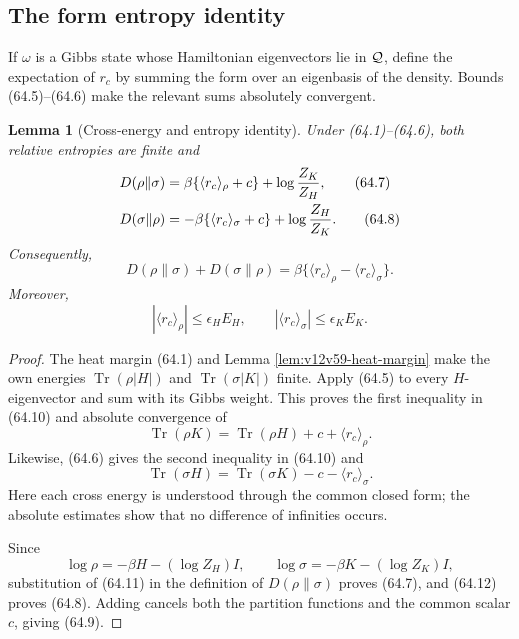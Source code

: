 \documentclass[11pt]{article}
\newtheorem{lemma}[theorem]{Lemma}
\theoremstyle{remark}
\begin{document}
\subsection{The form entropy identity}

If \(\omega\) is a Gibbs state whose Hamiltonian eigenvectors lie in
\({\cal Q}\), define the expectation of \(r_c\) by summing the form
over an eigenbasis of the density.  Bounds (64.5)--(64.6) make the
relevant sums absolutely convergent.

\begin{lemma}[Cross-energy and entropy identity]
\label{lem:v12v64-form-entropy}
Under (64.1)--(64.6), both relative entropies are finite and
\begin{align}
 D(\rho\|\sigma)
 &=
 \beta\{\langle r_c\rangle_\rho+c\}
 +\log{Z_K\over Z_H},                             \tag{64.7}\\
 D(\sigma\|\rho)
 &=
 -\beta\{\langle r_c\rangle_\sigma+c\}
 +\log{Z_H\over Z_K}.                             \tag{64.8}
\end{align}
Consequently,
\begin{equation}
 D(\rho\|\sigma)+D(\sigma\|\rho)
 =
 \beta\{
 \langle r_c\rangle_\rho-\langle r_c\rangle_\sigma\}.         \tag{64.9}
\end{equation}
Moreover,
\begin{equation}
 |\langle r_c\rangle_\rho|\leq\epsilon_HE_H,
 \qquad
 |\langle r_c\rangle_\sigma|\leq\epsilon_KE_K.    \tag{64.10}
\end{equation}
\end{lemma}

\begin{proof}
The heat margin (64.1) and Lemma
\ref{lem:v12v59-heat-margin} make the own energies
\(\operatorname{Tr}(\rho|H|)\) and
\(\operatorname{Tr}(\sigma|K|)\) finite.  Apply (64.5) to every
\(H\)-eigenvector and sum with its Gibbs weight.  This proves the
first inequality in (64.10) and absolute convergence of
\[
 \operatorname{Tr}(\rho K)
 =
 \operatorname{Tr}(\rho H)+c+\langle r_c\rangle_\rho.         \tag{64.11}
\]
Likewise, (64.6) gives the second inequality in (64.10) and
\[
 \operatorname{Tr}(\sigma H)
 =
 \operatorname{Tr}(\sigma K)-c-\langle r_c\rangle_\sigma.     \tag{64.12}
\]
Here each cross energy is understood through the common closed form;
the absolute estimates show that no difference of infinities occurs.

Since
\[
 \log\rho=-\beta H-(\log Z_H)I,\qquad
 \log\sigma=-\beta K-(\log Z_K)I,
\]
substitution of (64.11) in the definition of
\(D(\rho\|\sigma)\) proves (64.7), and (64.12) proves (64.8).
Adding cancels both the partition functions and the common scalar
\(c\), giving (64.9).
\end{proof}
\end{document}
